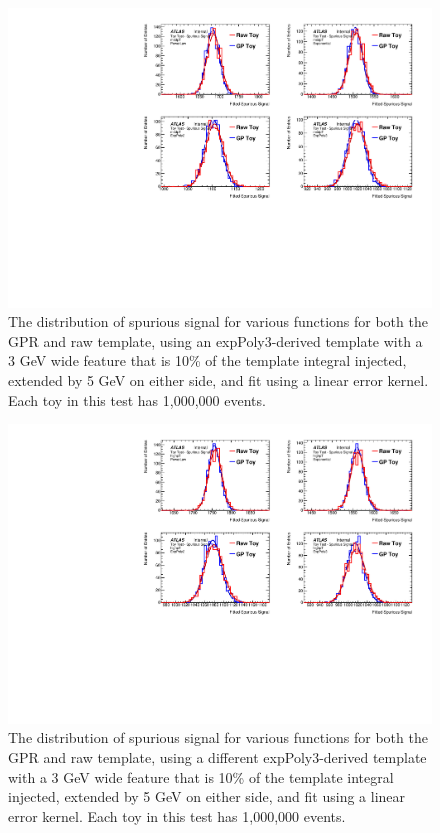 \begin{figure} 
\begin{center}
  \includegraphics[width=\textwidth]{figures/background/gpr/validation/linear/ToyTest_FitSigVals_medpT_100k_Siginj}   
\caption{The distribution of spurious signal for various functions for both the GPR and raw template, using an expPoly3-derived template with a 3 GeV wide feature that is 10\% of the template integral injected, extended by 5 GeV on either side, and fit using a linear error kernel. Each toy in this test has 1,000,000 events.}
\label{fig:linearkernel_medpt_100k_Siginj}
\end{center}
\end{figure}

\begin{figure} 
\begin{center}
  \includegraphics[width=\textwidth]{figures/background/gpr/validation/linear/ToyTest_FitSigVals_highpT_100k_Siginj}   
\caption{The distribution of spurious signal for various functions for both the GPR and raw template, using a different expPoly3-derived template with a 3 GeV wide feature that is 10\% of the template integral injected, extended by 5 GeV on either side, and fit using a linear error kernel. Each toy in this test has 1,000,000 events.}
\label{fig:linearkernel_highpt_100k_Siginj}
\end{center}
\end{figure}

